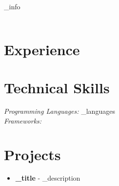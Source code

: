 \documentclass[a4paper,10pt]{article}
\begin{document}
\begin{center}
    \LARGE{{\textbf{{\name}}}} \\
    \normalsize{{\contact_info}} \\
    \normalsize{{\email}} \\
\end{center}

\vspace{0.2cm}

\section*{Experience}

\vspace{0.3cm}

\section*{Technical Skills}
\textit{Programming Languages:} {{\programming_languages}} \\
\textit{Frameworks:} {{\frameworks}}

\vspace{0.3cm}

\section*{Projects}
\begin{itemize}[leftmargin=*]
    \item \textbf{{\project_title}} - {{\project_description}}
\end{itemize}
\end{document}
